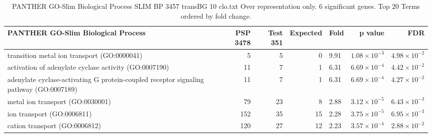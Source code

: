 

\begin{table}[ht]
\centering
\begin{adjustbox}{width=\textwidth}
\begin{tabular}{lrrrlrr}
  \hline
PANTHER GO-Slim Biological Process & PSP 3478 & Test 351 & Expected & Fold & p value & FDR \\ 
  \hline
transition metal ion transport (GO:0000041) & 5 & 5 & 0 & 9.91 & $1.08 \times 10^{-3}$ & $4.98 \times 10^{-2}$ \\ 
  activation of adenylate cyclase activity (GO:0007190) & 11 & 7 & 1 & 6.31 & $6.69 \times 10^{-4}$ & $4.42 \times 10^{-2}$ \\ 
  adenylate cyclase-activating G protein-coupled receptor signaling pathway (GO:0007189) & 11 & 7 & 1 & 6.31 & $6.69 \times 10^{-4}$ & $4.27 \times 10^{-2}$ \\ 
  metal ion transport (GO:0030001) & 79 & 23 & 8 & 2.88 & $3.12 \times 10^{-5}$ & $6.43 \times 10^{-3}$ \\ 
  ion transport (GO:0006811) & 152 & 35 & 15 & 2.28 & $3.75 \times 10^{-5}$ & $6.95 \times 10^{-3}$ \\ 
  cation transport (GO:0006812) & 120 & 27 & 12 & 2.23 & $3.57 \times 10^{-4}$ & $2.88 \times 10^{-2}$ \\ 
   \hline
\end{tabular}
\end{adjustbox}
\caption{PANTHER GO-Slim Biological Process SLIM BP 3457 transBG 10 clo.txt Over representation only. 6 significant genes. Top 20 Terms ordered by fold change. } 
\label{tab:PANTHER GO-Slim Biological Process SLIM BP 3457 transBG 10 clo.txt Over representation only. 6 significant genes. Top 20 Terms ordered by fold change. }
\end{table}


